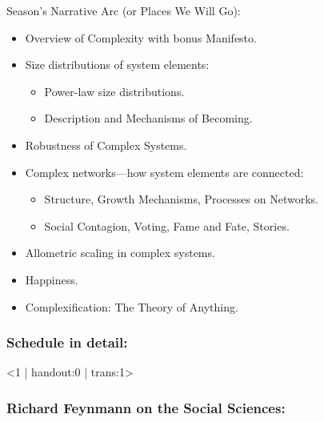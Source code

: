 
\begin{frame}

  \begin{block}{Season's Narrative Arc (or Places We Will Go):}
    \begin{itemize}
    \item<+->
      Overview of Complexity with bonus Manifesto.
    \item<+->
      Size distributions of system elements:
      \begin{itemize}
      \item<+->
        Power-law size distributions.
      \item<+->
        Description and Mechanisms of Becoming.
      \end{itemize}
    \item<+-> 
      Robustness of Complex Systems.
    \item<+-> 
      Complex networks---how system elements are connected:
      \begin{itemize}
      \item<+-> 
        Structure, Growth Mechanisms, Processes on Networks.
      \item<+-> 
        Social Contagion, Voting, Fame and Fate, Stories.
      \end{itemize}
    \item<+->
      Allometric scaling in complex systems.
    \item<+->
      Happiness.
    \item<+->
      Complexification: The Theory of Anything.
    \end{itemize}
  \end{block}

\end{frame}

\begin{frame}[plain]
  \frametitle{Schedule in detail:}

  \tiny
  \begin{block}{}
    \lectureschedule
  \end{block}

\end{frame}


\begin{frame}<1 | handout:0 | trans:1>

  \frametitle{Richard Feynmann on the  Social Sciences:}
  

\end{frame}

